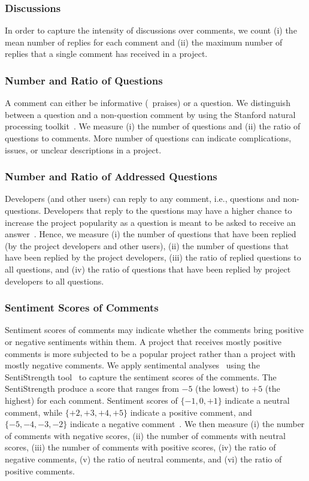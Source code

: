 \subsubsection*{Discussions} In order to capture the intensity of discussions over comments, we count (i) the mean number of
replies for each comment and (ii) the maximum number of replies that a single comment has received in a project.

\subsubsection*{Number and Ratio of Questions} A comment can either be informative (\eg~praises) or a question. We distinguish between a question and a non-question comment by using the Stanford natural processing toolkit~\cite{manning2014stanford}.
We measure (i) the number of questions and (ii) the ratio of questions to comments. More number of questions can indicate complications, issues, or unclear descriptions in a project.

\subsubsection*{Number and Ratio of Addressed Questions}
Developers (and other users) can reply to any comment, i.e., questions and non-questions.
Developers that reply to the questions may have a higher chance to increase the project popularity as a question is meant to be asked to receive an answer~\cite{ko2010power}.
Hence, we measure (i) the number of questions that have been replied (by the project developers and other users), (ii) the number of questions that have been replied by the project developers, (iii) the ratio of replied questions to all questions, and (iv) the ratio of questions that have been replied by project developers to all questions.

\subsubsection*{Sentiment Scores of Comments} Sentiment scores of comments may indicate whether the comments bring positive or negative sentiments within them.
A project that receives mostly positive comments is more subjected to be a popular project rather than a project with mostly negative comments.
We apply sentimental analyses~\cite{thelwall2010sentiment} using the SentiStrength tool~\cite{thelwall2012sentiment} to capture the sentiment scores of the comments. The SentiStrength produce a score that ranges from $-5$ (the lowest) to $+5$ (the highest) for each comment.
Sentiment scores of $\{-1, 0, +1\}$ indicate a neutral comment, while $\{+2, +3, +4, +5\}$ indicate a positive comment, and $\{-5, -4, -3, -2\}$ indicate a negative comment~\cite{thelwall2012sentiment}.
We then measure (i) the number of comments with negative scores, (ii) the number of comments with neutral scores, (iii) the number of comments with positive scores, (iv) the ratio of negative comments, (v) the ratio of neutral comments, and (vi) the ratio of positive comments.

